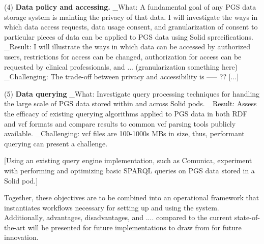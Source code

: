 \documentclass[11pt]{article}
\begin{document}

(4) \textbf{Data policy and accessing.} 
_What: A fundamental goal of any PGS data storage system is mainting the privacy of that data. 
I will investigate the ways in which data access requests, data usage consent, and granularization of consent to particular pieces of data can be applied to PGS data using Solid sprecifications.
_Result: I will illustrate the ways in which data can be accessed by authorized users, restrictions for access can be changed, authorization for access can be requested by clinical professionals, and ... (granularization something here)
_Challenging: The trade-off between privacy and accessibility is ----- ??
[...]

(5) \textbf{Data querying}
_What: Investigate query processing techniques for handling the large scale of PGS data stored within and across Solid pods. 
_Result: Assess the efficacy of existing querying algorithms applied to PGS data in both RDF and vcf formats and compare results to common vcf parsing tools publicly available.
_Challenging: vcf files are 100-1000s MBs in size, thus, performant querying can present a challenge.

[Using an existing query engine implementation, such as Comunica, experiment with performing and optimizing basic SPARQL queries on PGS data stored in a Solid pod.]

Together, these objectives are to be combined into an operational framework that instantiates workflows necessary for setting up and using the system. 
Additionally, advantages, disadvantages, and .... compared to the current state-of-the-art will be presented for future implementations to draw from for future innovation.
\end{document}
